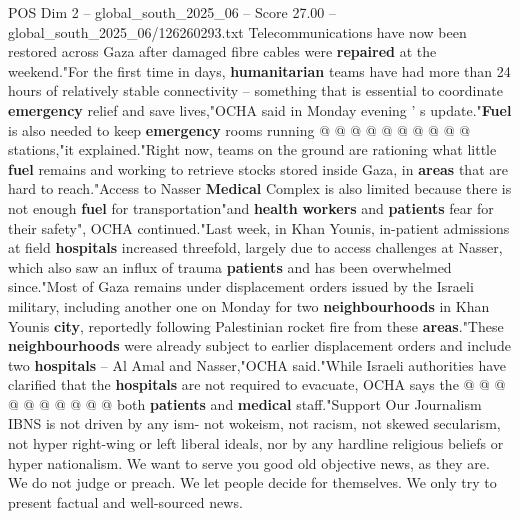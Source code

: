 \begin{textsample}{POS Dim 2 – global\_south\_2025\_06 – Score 27.00 – global\_south\_2025\_06/126260293.txt}
Telecommunications have now been restored across Gaza after damaged fibre cables were \textbf{repaired} at the weekend."For the first time in days, \textbf{humanitarian} teams have had more than 24 hours of relatively stable connectivity -- something that is essential to coordinate \textbf{emergency} relief and save lives,"OCHA said in Monday evening ' s update."\textbf{Fuel} is also needed to keep \textbf{emergency} rooms running @ @ @ @ @ @ @ @ @ @ stations,"it explained."Right now, teams on the ground are rationing what little \textbf{fuel} remains and working to retrieve stocks stored inside Gaza, in \textbf{areas} that are hard to reach."Access to Nasser \textbf{Medical} Complex is also limited because there is not enough \textbf{fuel} for transportation"and \textbf{health} \textbf{workers} and \textbf{patients} fear for their safety", OCHA continued."Last week, in Khan Younis, in-patient admissions at field \textbf{hospitals} increased threefold, largely due to access challenges at Nasser, which also saw an influx of trauma \textbf{patients} and has been overwhelmed since."Most of Gaza remains under displacement orders issued by the Israeli military, including another one on Monday for two \textbf{neighbourhoods} in Khan Younis \textbf{city}, reportedly following Palestinian rocket fire from these \textbf{areas}."These \textbf{neighbourhoods} were already subject to earlier displacement orders and include two \textbf{hospitals} -- Al Amal and Nasser,"OCHA said."While Israeli authorities have clarified that the \textbf{hospitals} are not required to evacuate, OCHA says the @ @ @ @ @ @ @ @ @ @ both \textbf{patients} and \textbf{medical} staff."Support Our Journalism IBNS is not driven by any ism- not wokeism, not racism, not skewed secularism, not hyper right-wing or left liberal ideals, nor by any hardline religious beliefs or hyper nationalism.
We want to serve you good old objective news, as they are.
We do not judge or preach.
We let people decide for themselves.
We only try to present factual and well-sourced news.

\end{textsample}

